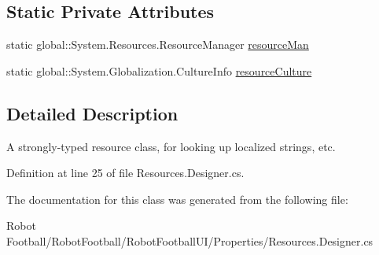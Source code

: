 \subsection*{Static Private Attributes}
\begin{CompactItemize}
\item 
\hypertarget{class_robot_football_u_i_1_1_properties_1_1_resources_3e501c695f037230a1595ae056227326}{
static global::System.Resources.Resource\-Manager \hyperlink{class_robot_football_u_i_1_1_properties_1_1_resources_3e501c695f037230a1595ae056227326}{resource\-Man}}
\label{class_robot_football_u_i_1_1_properties_1_1_resources_3e501c695f037230a1595ae056227326}

\item 
\hypertarget{class_robot_football_u_i_1_1_properties_1_1_resources_7f8d1a36b2222ceea1b17769b5847195}{
static global::System.Globalization.Culture\-Info \hyperlink{class_robot_football_u_i_1_1_properties_1_1_resources_7f8d1a36b2222ceea1b17769b5847195}{resource\-Culture}}
\label{class_robot_football_u_i_1_1_properties_1_1_resources_7f8d1a36b2222ceea1b17769b5847195}

\end{CompactItemize}


\subsection{Detailed Description}
A strongly-typed resource class, for looking up localized strings, etc. 



Definition at line 25 of file Resources.Designer.cs.

The documentation for this class was generated from the following file:\begin{CompactItemize}
\item 
Robot Football/Robot\-Football/Robot\-Football\-UI/Properties/Resources.Designer.cs\end{CompactItemize}
